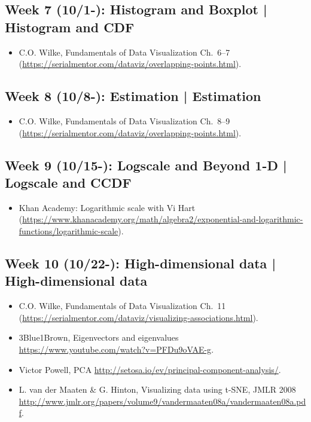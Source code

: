 \documentclass[11pt,article,oneside]{memoir} %
\begin{document}
\subsection{Week 7 (10/1-): Histogram and Boxplot | Histogram and CDF }

\begin{itemize}\itemsep0em 
\item C.O. Wilke, Fundamentals of Data Visualization Ch.~6--7 (\url{https://serialmentor.com/dataviz/overlapping-points.html}). 
\end{itemize}	

\subsection{Week 8 (10/8-): Estimation | Estimation }

\begin{itemize}\itemsep0em 
\item C.O. Wilke, Fundamentals of Data Visualization Ch.~8--9 (\url{https://serialmentor.com/dataviz/overlapping-points.html}). 
\end{itemize}	

\subsection{Week 9 (10/15-): Logscale and Beyond 1-D | Logscale and CCDF}

\begin{itemize}\itemsep0em 
\item Khan Academy: Logarithmic scale with Vi Hart (\url{https://www.khanacademy.org/math/algebra2/exponential-and-logarithmic-functions/logarithmic-scale}). 
\end{itemize}	

\subsection{Week 10 (10/22-): High-dimensional data | High-dimensional data }

\begin{itemize}\itemsep0em 
\item C.O. Wilke, Fundamentals of Data Visualization Ch.~11 (\url{https://serialmentor.com/dataviz/visualizing-associations.html}). 
\item 3Blue1Brown, Eigenvectors and eigenvalues \url{https://www.youtube.com/watch?v=PFDu9oVAE-g}. 
\item Victor Powell, PCA \url{http://setosa.io/ev/principal-component-analysis/}.
\item L. van der Maaten \& G. Hinton, Visualizing data using t-SNE, JMLR 2008 \url{http://www.jmlr.org/papers/volume9/vandermaaten08a/vandermaaten08a.pdf}.
\end{itemize}	
\end{document}
